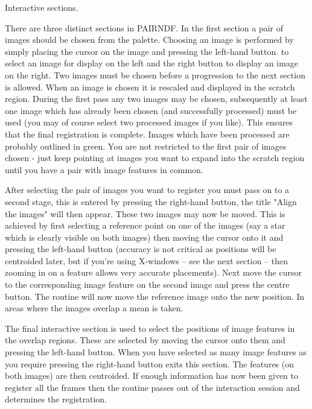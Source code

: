 {{{         \sstitem
         Interactive sections.

      }

       There are three distinct sections in PAIRNDF. In the first
       section a pair of images should be chosen from the palette.
       Choosing an image is performed by simply placing the cursor on
       the image and pressing the left-hand button. to select an image
       for display on the left and the right button to display an
       image on the right. Two images must be chosen before a
       progression to the next section is allowed.  When an image is
       chosen it is rescaled and displayed in the scratch region.
       During the first pass any two images may be chosen,
       subsequently at least one image which has already been chosen
       (and successfully processed) must be used (you may of course
       select two processed images if you like). This ensures that
       the final registration is complete. Images which have been
       processed are probably outlined in green. You are not
       restricted to the first pair of images chosen - just keep
       pointing at images you want to expand into the scratch region
       until you have a pair with image features in common.

       After selecting the pair of images you want to register you
       must pass on to a second stage, this is entered by pressing the
       right-hand button, the title "Align the images" will then
       appear. These two images may now be moved. This is achieved by
       first selecting a reference point on one of the images (say a
       star which is clearly visible on both images) then moving the
       cursor onto it and pressing the left-hand button (accuracy is
       not critical as positions will be centroided later, but if
       you're using X-windows -- see the next section -- then zooming
       in on a feature allows very accurate placements). Next move the
       cursor to the corresponding image feature on the second image
       and press the centre button. The routine will now move the
       reference image onto the new position. In areas where the
       images overlap a mean is taken.

       The final interactive section is used to select the positions of
       image features in the overlap regions. These are selected by
       moving the cursor onto them and pressing the left-hand button.
       When you have selected as many image features as you require
       pressing the right-hand button exits this section. The features
       (on both images) are then centroided. If enough information has
       now been given to register all the frames then the routine 
       passes out of the interaction session and determines the 
       registration.
      \sstitemlist{

}}}
